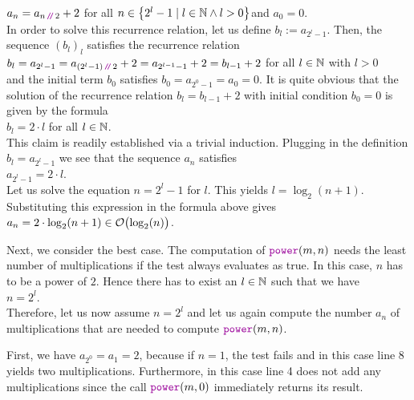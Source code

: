 \hspace*{1.3cm}
$a_n = a_{n \dvv 2} + 2$ \qquad for all $n \in \left\{2^l - 1 \mid l \in {\mathbb N} \wedge l > 0\right\}$\quad and $a_0 = 0$.
\\[0.2cm]
In order to solve this recurrence relation, let us define $b_l := a_{2^l-1}$.  Then, the sequence
$(b_l)_l$ 
satisfies the recurrence relation
 \\[0.2cm]
\hspace*{1.3cm} 
$\ds b_l = a_{2^l-1} = a_{(2^l-1) \dvv 2} + 2 = a_{2^{l-1}-1} + 2 = b_{l-1} +2$ \qquad for all $l\in{\mathbb N}$ with
$l > 0$
\\[0.2cm]
and the initial term $b_0$ satisfies $b_0 = a_{2^0-1} = a_0 = 0$.  It is quite obvious that the
solution of the recurrence relation $b_l = b_{l-1} + 2$ with initial condition $b_0 = 0$ is given by the formula
\\[0.2cm]
\hspace*{1.3cm} $b_l = 2 \cdot l$ \qquad for all $l \in {\mathbb N}$. 
\\[0.2cm] 
This claim is readily established via a trivial induction.  Plugging in the definition $b_l = a_{2^l-1}$ we
see that the sequence $a_n$ satisfies \\[0.2cm]
\hspace*{1.3cm} $a_{2^l-1} = 2 \cdot l$. 
\\[0.2cm]
Let us solve the equation $n = 2^l - 1$ for $l$.  This yields
 $l =
\log_2(n+1)$.  Substituting this expression in the formula above gives \\[0.2cm]
\hspace*{1.3cm} $a_n = 2 \cdot \log_2(n+1) \in \mathcal{O}\bigl(\log_2(n)\bigr)$.
\vspace*{0.2cm}

Next, we consider the best case.  The computation of
$\mytt{power}(m,n)$ needs the least number of multiplications if the test 
always evaluates as true.  In this case, $n$ has to be a power of $2$.  
Hence there has to exist an $l\in {\mathbb N}$ such that we have
 \\[0.2cm]
\hspace*{1.3cm} $n = 2^l$.
 \\[0.2cm]
Therefore, let us now assume $n = 2^l$ and let us again compute the number $a_n$ of multiplications
that are needed to compute $\mytt{power}(m,n)$. 

First, we have $a_{2^0} = a_1 = 2$, because if $n = 1$, the test  fails and in
this case line 8 yields two multiplications.  Furthermore, in this case
line 4 does not add any multiplications since the call $\mytt{power}(m,0)$ immediately returns its
result.

